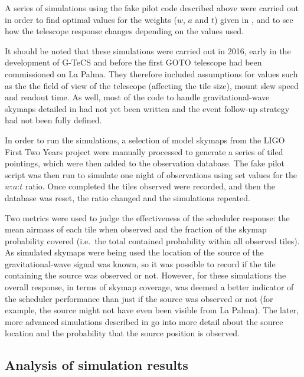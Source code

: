 \begin{colsection}
\begin{colsection}
A series of simulations using the fake pilot code described above were carried out in order to find optimal values for the weights ($w$, $a$ and $t$) given in , and to see how the telescope response changes depending on the values used.

It should be noted that these simulations were carried out in 2016, early in the development of G-TeCS and before the first GOTO telescope had been commissioned on La Palma. They therefore included assumptions for values such as the the field of view of the telescope (affecting the tile size), mount slew speed and readout time. As well, most of the code to handle gravitational-wave skymaps detailed in  had not yet been written and the event follow-up strategy had not been fully defined.

In order to run the simulations, a selection of model skymaps from the LIGO First Two Years project \citep{First2Years} were manually processed to generate a series of tiled pointings, which were then added to the observation database. The fake pilot script was then run to simulate one night of observations using set values for the $w$:$a$:$t$ ratio. Once completed the tiles observed were recorded, and then the database was reset, the ratio changed and the simulations repeated.

Two metrics were used to judge the effectiveness of the scheduler response: the mean airmass of each tile when observed and the fraction of the skymap probability covered (i.e.\ the total contained probability within all observed tiles). As simulated skymaps were being used the location of the source of the gravitational-wave signal was known, so it was possible to record if the tile containing the source was observed or not. However, for these simulations the overall response, in terms of skymap coverage, was deemed a better indicator of the scheduler performance than just if the source was observed or not (for example, the source might not have even been visible from La Palma). The later, more advanced simulations described in  go into more detail about the source location and the probability that the source position is observed.

\end{colsection}

\newpage
\subsection{Analysis of simulation results}
\label{sec:scheduler_sim_analysis}
\begin{colsection}


\end{colsection}
\end{colsection}
